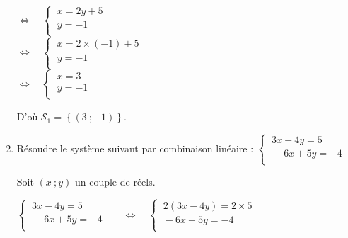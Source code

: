 \documentclass[a4paper,11pt,exos]{nsi}
\begin{document}
\begin{enumerate}
\begin{tabbing}
                \>  $\iff \quad \left\{
                    \begin{array}{l}
                    \ x=2y+5 \\
                    \ y=-1\\
                \end{array} \right.$\\[1em]

                \>  $\iff \quad \left\{
                    \begin{array}{l}
                    \ x=2\times (-1)+5 \\
                    \ y=-1\\
                \end{array} \right.$\\[1em]

                \>  $\iff \quad \left\{
                    \begin{array}{l}
                    \ x=3 \\
                    \ y=-1\\
                \end{array} \right.$
            \end{tabbing}
            D'où $\mathcal{S}_1=\left\{(3\ ;-1)\right\}$.
        \item \textcolor{UGLiBlue}{Résoudre le système suivant par combinaison linéaire : $\left\{
			\begin{array}{l}
				\ 3x-4y=5 \\
				\ -6x+5y=-4 \\
			\end{array} \right.$}
        
        Soit $(x\ ;y)$ un couple de réels.
            \begin{tabbing}
                $\left\{
                    \begin{array}{l}
                    \ 3x-4y=5 \\
                    \ -6x+5y=-4 \\
                \end{array} \right. \quad$
                \= $\iff \quad \left\{
                    \begin{array}{l}
                    \ 2(3x-4y)=2\times 5 \\
                    \ -6x+5y=-4 \\
                \end{array} \right.$\\[1em]
                

\end{tabbing}
\end{enumerate}
\end{document}
